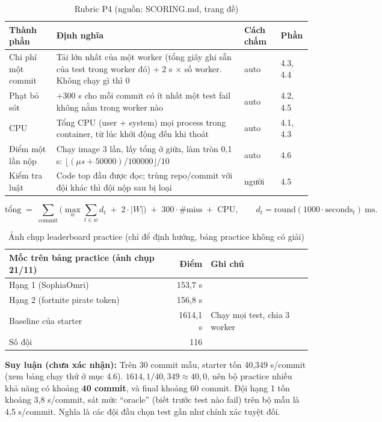 \documentclass[a4paper,12pt]{article}
\newcommand{\src}[1]{{\footnotesize\textcolor{p7}{(nguồn: #1)}}}
\begin{document}
\begin{table}[H]
\centering\small
\begin{tabularx}{\textwidth}{L{3.6cm}Y C{2.1cm}C{1.4cm}}
\toprule
\textbf{Thành phần} & \textbf{Định nghĩa} & \textbf{Cách chấm} & \textbf{Phần} \\
\midrule
Chi phí một commit & Tải lớn nhất của một worker (tổng giây ghi sẵn của test trong worker đó) $+\;2$ s $\times$ số worker. Không chạy gì thì 0 & auto & 4.3, 4.4 \\
Phạt bỏ sót & $+300$ s cho mỗi commit có ít nhất một test fail không nằm trong worker nào & auto & 4.2, 4.5 \\
CPU & Tổng CPU (user + system) mọi process trong container, từ lúc khởi động đến khi thoát & auto & 4.1, 4.3 \\
Điểm một lần nộp & Chạy image 3 lần, lấy tổng ở giữa, làm tròn 0,1 s: $\lfloor(\mu s+50000)/100000\rfloor/10$ & auto & 4.6 \\
Kiểm tra luật & Code top đầu được đọc; trùng repo/commit với đội khác thì đội nộp sau bị loại & người & 4.5 \\
\bottomrule
\end{tabularx}
\caption{Rubric P4 \src{SCORING.md, trang đề}}
\end{table}

\[
\text{tổng} \;=\; \sum_{\text{commit}}\Big(\max_{w}\sum_{t\in w} d_t \;+\; 2\cdot|W|\Big) \;+\; 300\cdot \#\text{miss} \;+\; \text{CPU},\qquad d_t=\mathrm{round}(1000\cdot\text{seconds}_t)\ \text{ms}.
\]

\begin{table}[H]
\centering\small
\begin{tabular}{lrl}
\toprule
\textbf{Mốc trên bảng practice (ảnh chụp 21/11)} & \textbf{Điểm} & \textbf{Ghi chú} \\
\midrule
Hạng 1 (SophiaOmri) & 153,7 s & \\
Hạng 2 (fortnite pirate token) & 156,8 s & \\
Baseline của starter & 1614,1 s & Chạy mọi test, chia 3 worker \\
Số đội & 116 & \\
\bottomrule
\end{tabular}
\caption{Ảnh chụp leaderboard practice (chỉ để định hướng, bảng practice không có giải)}
\end{table}

\begin{mdframed}[linecolor=orange,linewidth=1pt,backgroundcolor=orange!8]
\textbf{Suy luận (chưa xác nhận):} Trên 30 commit mẫu, starter tốn 40,349 s/commit (xem bảng chạy thử ở mục 4.6). $1614{,}1/40{,}349 \approx 40{,}0$, nên bộ practice nhiều khả năng có khoảng \textbf{40 commit}, và final khoảng 60 commit. Đội hạng 1 tốn khoảng 3,8 s/commit, sát mức ``oracle'' (biết trước test nào fail) trên bộ mẫu là 4,5 s/commit. Nghĩa là các đội đầu chọn test gần như chính xác tuyệt đối.
\end{mdframed}
\end{document}
